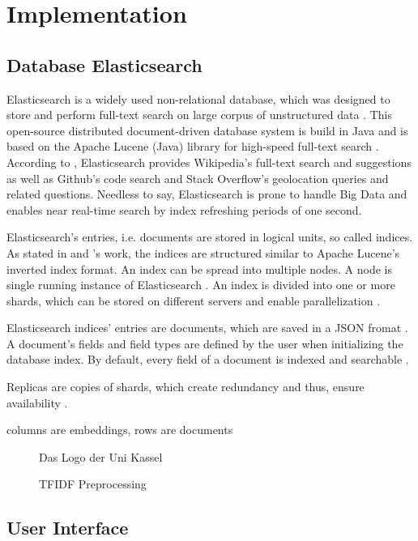 \newcommand{\databaseName}{Elasticsearch}
\chapter{Implementation}\label{ch:implementation}

\section{Database Elasticsearch}\label{subsec:db}
\databaseName{} is a widely used non-relational database, which was designed to store and perform full-text search on large corpus of unstructured data \cite{Elasticsearch2017}.
This open-source distributed document-driven database system is build in Java and is based on the Apache Lucene (Java) library for high-speed full-text search \cite{Elasticsearch2017,Elasticsearch2019}.
According to \cite{Elasticsearch2019}, \databaseName{} provides Wikipedia's full-text search and suggestions as well as Github's code search and Stack Overflow's geolocation queries and related questions.
Needless to say, \databaseName{} is prone to handle Big Data and enables near real-time search by index refreshing periods of one second.

\databaseName{}'s entries, i.e. documents are stored in logical units, so called indices.
As stated in \citeauthor{Elasticsearch2019} and \citeauthor{Elasticsearch2017}'s work, the indices are structured similar to Apache Lucene's inverted index format.
An index can be spread into multiple nodes.
A node is single running instance of \databaseName{} \cite{Elasticsearch2019}.
An index is divided into one or more shards, which can be stored on different servers and enable parallelization \cite{Elasticsearch2019}.

\databaseName{} indices' entries are documents, which are saved in a JSON fromat \cite{Elasticsearch2017}.
A document's fields and field types are defined by the user when initializing the database index.
By default, every field of a document is indexed and searchable \cite{Elasticsearch2019}.

Replicas are copies of shards, which create redundancy and thus, ensure availability \cite{Elasticsearch2019}.





columns are embeddings, rows are documents

\begin{figure}[htp] %
    \centering
    
    \caption{Das Logo der Uni Kassel}
    \label{fig:pdf2db}
\end{figure}

\begin{figure}[htp] %
    \centering
    
    \caption{TFIDF Preprocessing}
    \label{fig:preprocessing}
\end{figure}

\section{User Interface}\label{sec:ui}